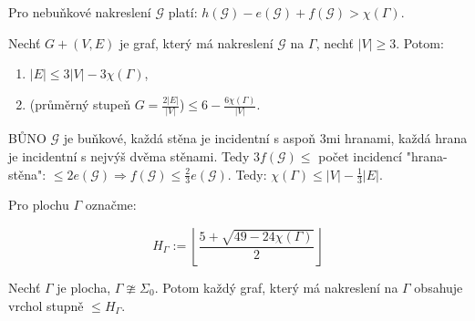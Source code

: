 \begin{fakt}
	Pro nebuňkové nakreslení $\mathcal{G}$ platí: $h(\mathcal{G}) - e(\mathcal{G}) + f(\mathcal{G}) > \chi(\Gamma)$.
\end{fakt}

\begin{dusl}
	Nechť $G+(V,E)$ je graf, který má nakreslení $\mathcal{G}$ na $\Gamma$, nechť $|V| \geq 3$. Potom:
	
	\begin{enumerate}
		\item $|E| \leq 3 |V| - 3 \chi (\Gamma)$,
		\item (průměrný stupeň $G = \frac{2|E|}{|V|}$)$\leq 6 - \frac{6 \chi(\Gamma)}{|V|}$.
	\end{enumerate}
\end{dusl}

\begin{dukaz}
	BŮNO $\mathcal{G}$ je buňkové, každá stěna je incidentní s aspoň 3mi hranami, každá hrana je incidentní s nejvýš dvěma stěnami. Tedy $3 f(\mathcal{G}) \leq$ počet incidencí "hrana-stěna": $\leq 2 e(\mathcal{G}) \Rightarrow f(\mathcal{G}) \leq \frac{2}{3} e(\mathcal{G})$. Tedy: $\chi(\Gamma) \leq |V| - \frac{1}{3}|E|$.
\end{dukaz}

\begin{definice}
	Pro plochu $\Gamma$ označme:
	
	$$
	H_{\Gamma} := \left\lfloor \frac{5+\sqrt{49-24 \chi(\Gamma)}}{2} \right\rfloor
	$$
\end{definice}

\begin{veta}
	Nechť $\Gamma$ je plocha, $\Gamma \ncong \Sigma_{0}$. Potom každý graf, který má nakreslení na $\Gamma$ obsahuje vrchol stupně $\leq H_{\Gamma}$.
\end{veta}

